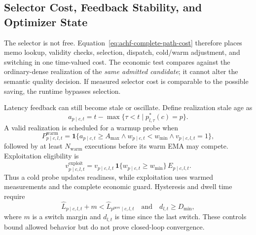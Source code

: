\documentclass{article}
\begin{document}
\subsection{Selector Cost, Feedback Stability, and Optimizer State}

The selector is not free. Equation~\eqref{eq:achf-complete-path-cost} therefore
places memo lookup, validity checks, selection, dispatch, cold/warm adjustment,
and switching in one time-valued cost. The economic test compares against the
ordinary-dense realization of the \emph{same admitted candidate}; it cannot
alter the semantic quality decision. If measured selector cost is comparable
to the possible saving, the runtime bypasses selection.

Latency feedback can still become stale or oscillate. Define realization stale
age as
\begin{equation}
a_{p\mid c,t}
=
t-\max\{\tau<t\mid p^*_{l,\tau}(c)=p\}.
\label{eq:achf-stale-age}
\end{equation}
A valid realization is scheduled for a warmup probe when
\begin{equation}
P^{\mathrm{warm}}_{p\mid c,l,t}
=
\mathbf{1}\{
a_{p\mid c,t}\ge A_{\max}
\land
w_{p\mid c,t}<w_{\min}
\land
v_{p\mid c,l,t}=1
\},
\label{eq:achf-probing}
\end{equation}
followed by at least $N_{\mathrm{warm}}$ executions before its warm EMA may
compete. Exploitation eligibility is
\begin{equation}
v^{\mathrm{exploit}}_{p\mid c,l,t}
=
v_{p\mid c,l,t}\,
\mathbf{1}\{w_{p\mid c,t}\ge w_{\min}\}\,
E_{p\mid c,l,t}.
\label{eq:achf-recovery-eligibility}
\end{equation}
Thus a cold probe updates readiness, while exploitation uses warmed
measurements and the complete economic guard. Hysteresis and dwell time require
\begin{equation}
\widehat L_{p\mid c,l,t}+m
<\widehat L_{p^{\mathrm{prev}}\mid c,l,t}
\quad\mathrm{and}\quad
d_{l,t}\ge D_{\min},
\label{eq:achf-hysteresis}
\end{equation}
where $m$ is a switch margin and $d_{l,t}$ is time since the last switch. These
controls bound allowed behavior but do not prove closed-loop convergence.
\end{document}
